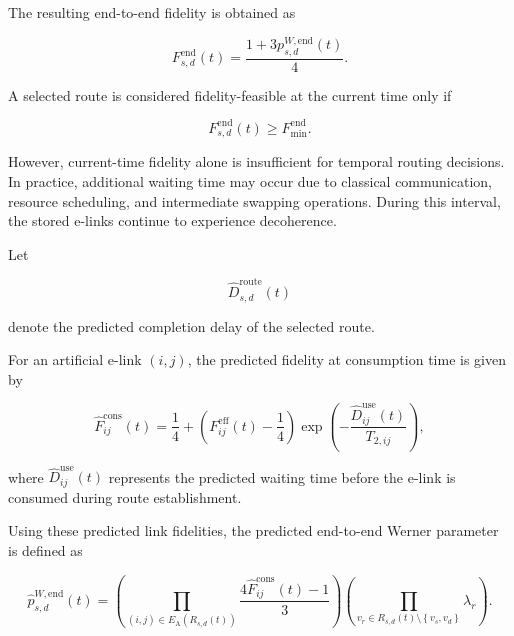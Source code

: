 The resulting end-to-end fidelity is obtained as

\begin{equation}
    F_{s,d}^{\mathrm{end}}(t)
    =
    \frac{
    1+
    3p_{s,d}^{W,\mathrm{end}}(t)
    }{4}.
\end{equation}

A selected route is considered fidelity-feasible at the current time only if

\begin{equation}
    F_{s,d}^{\mathrm{end}}(t)
    \geq
    F_{\min}^{\mathrm{end}}.
\end{equation}

However, current-time fidelity alone is insufficient for temporal routing decisions. In practice, additional waiting time may occur due to classical communication, resource scheduling, and intermediate swapping operations. During this interval, the stored e-links continue to experience decoherence.

Let

\begin{equation}
    \widehat{D}_{s,d}^{\mathrm{route}}(t)
\end{equation}

denote the predicted completion delay of the selected route.

For an artificial e-link $(i,j)$, the predicted fidelity at consumption time is given by

\begin{equation}
    \widehat{F}_{ij}^{\mathrm{cons}}(t)
    =
    \frac{1}{4}
    +
    \left(
    F_{ij}^{\mathrm{eff}}(t)
    -
    \frac{1}{4}
    \right)
    \exp
    \left(
    -\frac{
    \widehat{D}_{ij}^{\mathrm{use}}(t)
    }{
    T_{2,ij}
    }
    \right),
\end{equation}

where $\widehat{D}_{ij}^{\mathrm{use}}(t)$ represents the predicted waiting time before the e-link is consumed during route establishment.

Using these predicted link fidelities, the predicted end-to-end Werner parameter is defined as

\begin{equation}
    \widehat{p}_{s,d}^{W,\mathrm{end}}(t)
    =
    \left(
    \prod_{
    (i,j)
    \in
    E_{\mathrm{A}}(R_{s,d}(t))
    }
    \frac{
    4\widehat{F}_{ij}^{\mathrm{cons}}(t)-1
    }{3}
    \right)
    \left(
    \prod_{
    v_r
    \in
    R_{s,d}(t)
    \setminus
    \left\{
    v_s,v_d
    \right\}
    }
    \lambda_r
    \right).
\end{equation}

